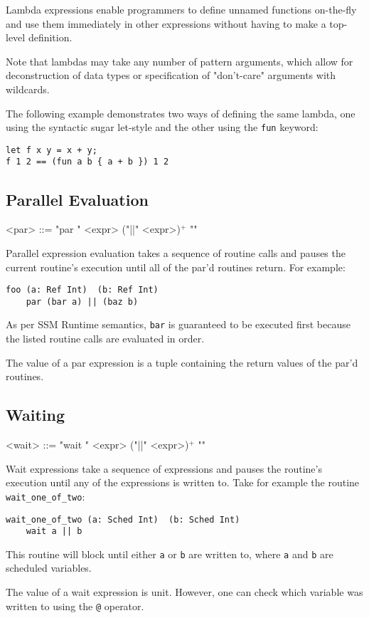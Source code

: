 \documentclass{article}
\begin{document}
Lambda expressions enable programmers to define unnamed functions on-the-fly and use them immediately in other expressions without having to make a top-level definition.

Note that lambdas may take any number of pattern arguments, which allow for deconstruction of data types or specification of "don't-care" arguments with wildcards.

The following example demonstrates two ways of defining the same lambda, one using the syntactic sugar let-style and the other using the \texttt{fun} keyword:
\begin{lstlisting}
let f x y = x + y;
f 1 2 == (fun a b { a + b }) 1 2
\end{lstlisting}
\subsection{Parallel Evaluation}
\begin{grammar}
<par> ::= "par {" <expr> ("||" <expr>)$^{+}$ "}"
\end{grammar}
Parallel expression evaluation takes a sequence of routine calls and pauses the current routine's execution until all of the par'd routines return. For example:
\begin{lstlisting}
foo (a: Ref Int)  (b: Ref Int)
    par (bar a) || (baz b)
\end{lstlisting}
As per SSM Runtime semantics, \texttt{bar} is guaranteed to be executed first because the listed routine calls are evaluated in order.

The value of a par expression is a tuple containing the return values of the par'd routines.
\subsection{Waiting}
\begin{grammar}
<wait> ::= "wait {" <expr> ("||" <expr>)$^{+}$ "}"
\end{grammar}
Wait expressions take a sequence of expressions and pauses the routine's execution until any of the expressions is written to. Take for example the routine \texttt{wait_one_of_two}:
\begin{lstlisting}
wait_one_of_two (a: Sched Int)  (b: Sched Int)
    wait a || b
\end{lstlisting}
This routine will block until either \texttt{a} or \texttt{b} are written to, where \texttt{a} and  \texttt{b} are scheduled variables.

The value of a wait expression is unit. However, one can check which variable was written to using the \texttt{@} operator.
\end{document}
